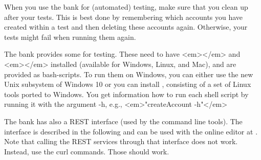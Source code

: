 When you use the bank for (automated) testing, make sure that you clean up after your tests. This is best done by remembering which accounts you have created within a test and then deleting these accounts again. Otherwise, your tests might fail when running them again.

The bank provides some  for testing. These need to have <em></em> and <em></em> installed (available for Windows, Linux, and Mac), and are provided as bash-scripts. To run them on Windows, you can either use the new Unix subsystem of Windows 10 or you can install , consisting of a set of Linux tools ported to Windows. You get information how to run each shell script by running it with the argument -h, e.g., <em>"createAccount -h"</em>

The bank has also a REST interface (used by the command line tools). The interface is described in the following  and can be used with the online editor at . Note that calling the REST services through that interface does not work. Instead, use the curl commands. Those should work.


